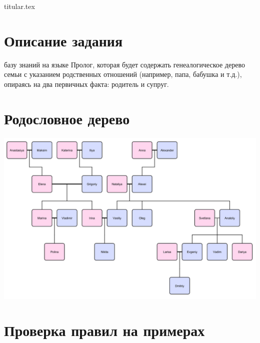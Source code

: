 \documentclass[11pt, a4paper]{article}
\begin{document}
{titular.tex}
\newpage

\section{Описание задания}

 базу знаний на языке Пролог, которая будет содержать генеалогическое дерево семьи с указанием родственных отношений (например, папа, бабушка и т.д.), опираясь на два первичных факта: родитель и супруг. 

\section{Родословное дерево}
\includegraphics[width=\linewidth]{tree.png}

\section{Проверка правил на примерах}






\end{document}

